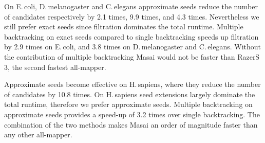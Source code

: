 On E.\,coli, D.\,melanogaster and C.\,elegans approximate seeds reduce the number of candidates respectively by 2.1 times, 9.9 times, and 4.3 times.
Nevertheless we still prefer exact seeds since filtration dominates the total runtime.
Multiple backtracking on exact seeds compared to single backtracking speeds up filtration by 2.9 times on E.\,coli, and 3.8 times on D.\,melanogaster and C.\,elegans.
Without the contribution of multiple backtracking Masai would not be faster than RazerS\,3, the second fastest all-mapper.

Approximate seeds become effective on H.\,sapiens, where they reduce the number of candidates by 10.8 times. 
On H.\,sapiens seed extensions largely dominate the total runtime, therefore we prefer approximate seeds.
Multiple backtracking on approximate seeds provides a speed-up of 3.2 times over single backtracking.
The combination of the two methods makes Masai an order of magnitude faster than any other all-mapper.

